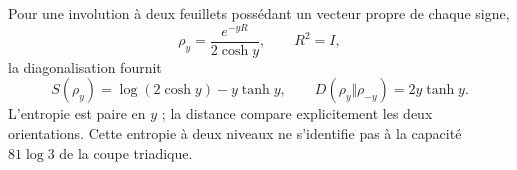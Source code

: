 Pour une involution à deux feuillets possédant un vecteur propre de chaque signe,
\[
\rho_y=\frac{e^{-yR}}{2\cosh y},\qquad R^2=I,
\]
la diagonalisation fournit
\[
S(\rho_y)=\log(2\cosh y)-y\tanh y,\qquad
D(\rho_y\Vert\rho_{-y})=2y\tanh y.
\]
L'entropie est paire en $y$ ; la distance compare explicitement
les deux orientations. Cette entropie à deux niveaux ne s'identifie pas
à la capacité $81\log3$ de la coupe triadique.
